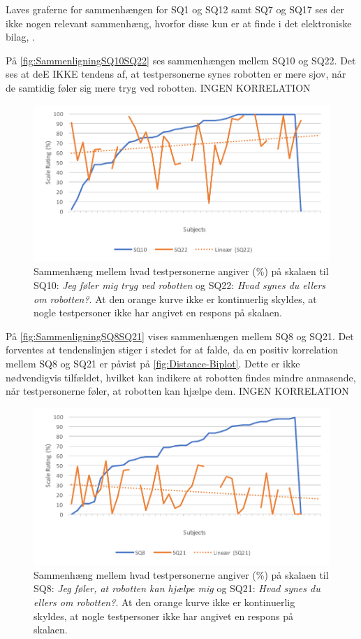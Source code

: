 Laves graferne for sammenhængen for SQ1 og SQ12 samt SQ7 og SQ17 ses der ikke nogen relevant sammenhæng, hvorfor disse kun er at finde i det elektroniske bilag, .

På \autoref{fig:SammenligningSQ10SQ22} ses sammenhængen mellem SQ10 og SQ22. Det ses at deE IKKE tendens af, at testpersonerne synes robotten er mere sjov, når de samtidig føler sig mere tryg ved robotten. INGEN KORRELATION
%
\begin{figure}[H]
	\centering
	\includegraphics[width=\textwidth]{Figure/Korrelationsgrafer/SQ10+SQ22}
	\caption{Sammenhæng mellem hvad testpersonerne angiver (\%) på skalaen til SQ10: \textit{Jeg føler mig tryg ved robotten} og SQ22: \textit{Hvad synes du ellers om robotten?}. At den orange kurve ikke er kontinuerlig skyldes, at nogle testpersoner ikke har angivet en respons på skalaen.}
	\label{fig:SammenligningSQ10SQ22}
\end{figure}
\noindent
%
På \autoref{fig:SammenligningSQ8SQ21} vises sammenhængen mellem SQ8 og SQ21. Det forventes at tendenslinjen stiger i stedet for at falde, da en positiv korrelation mellem SQ8 og SQ21 er påvist på \autoref{fig:Distance-Biplot}. Dette er ikke nødvendigvis tilfældet, hvilket kan indikere at robotten findes mindre anmasende, når testpersonerne føler, at robotten kan hjælpe dem. INGEN KORRELATION
%
\begin{figure}[H]
	\centering
	\includegraphics[width=\textwidth]{Figure/Korrelationsgrafer/SQ8+SQ21}
	\caption{Sammenhæng mellem hvad testpersonerne angiver (\%) på skalaen til SQ8: \textit{Jeg føler, at robotten kan hjælpe mig} og SQ21: \textit{Hvad synes du ellers om robotten?}. At den orange kurve ikke er kontinuerlig skyldes, at nogle testpersoner ikke har angivet en respons på skalaen.}
	\label{fig:SammenligningSQ8SQ21}
\end{figure}

